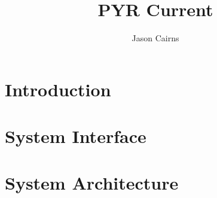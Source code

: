 \documentclass[a4paper,10pt]{article}
\begin{document}
\title{PYR Current}
\author{Jason Cairns}
  
\maketitle{}

\section{Introduction}
\section{System Interface}
\section{System Architecture}\label{sec:sys-arch}
\printbibliography
\end{document}
